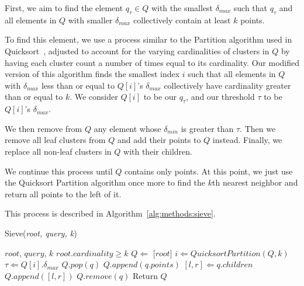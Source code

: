 First, we aim to find the element $q_{\tau} \in Q$ with the smallest $\delta_{max}$ such that 
$q_{\tau}$ and all elements in $Q$ with smaller $\delta_{max}$ collectively contain at least $k$ points. 

To find this element, we use a process similar to the Partition algorithm used in Quicksort~\cite{10.1093/comjnl/5.1.10}, adjusted to account for the varying cardinalities of clusters in $Q$ by having each cluster count a number of times equal to its cardinality.
Our modified version of this algorithm finds the smallest index $i$ such that all elements in $Q$ with $\delta_{max}$ less than or equal to $Q[i]$'s $\delta_{max}$ collectively have cardinality greater than or equal to $k$.
We consider $Q[i]$ to be our $q_{\tau}$, and our threshold $\tau$ to be $Q[i]$'s $\delta_{max}$.

We then remove from $Q$ any element whose $\delta_{min}$ is greater than $\tau$.
Then we remove all leaf clusters from $Q$ and add their points to $Q$ instead.
Finally, we replace all non-leaf clusters in $Q$ with their children. 

We continue this process until $Q$ contains only points.
At this point, we just use the Quicksort Partition algorithm once more to find the $k$th nearest neighbor and return all points to the left of it.

This process is described in Algorithm~\ref{alg:methods:sieve}. 

\begin{algorithm} %
    \caption{Sieve(\emph{root, query, k})} %
    \label{alg:methods:sieve} %
    \begin{algorithmic} %
        \REQUIRE $root$, $query$, $k$
        \REQUIRE $root.cardinality \geq k$
        \STATE $Q \Leftarrow$ [$root$]
            \STATE $i \Leftarrow QuicksortPartition(Q, k)$
            \STATE $\tau \Leftarrow Q[i].\delta_{max}$
                    \STATE $Q.pop(q)$
                \ENDIF
            \ENDFOR
                    \STATE $Q.append(q.points)$
                \ELSE
                    \STATE $[l, r] \Leftarrow q.children$
                    \STATE $Q.append([l, r])$   
                \ENDIF
                \STATE $Q.remove(q)$
            \ENDFOR 
        \ENDWHILE
        \STATE Return $Q$
    \end{algorithmic}
\end{algorithm}


